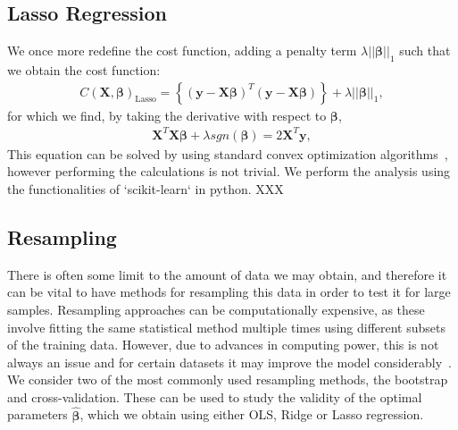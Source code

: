 \documentclass[reprint,english,notitlepage]{revtex4-1}  %
\begin{document}
\subsection*{Lasso Regression}
We once more redefine the cost function, adding a penalty term $\lambda||\boldsymbol{\beta}||_1$ such that we obtain the cost function: 
\begin{align}\label{eq: costfunc_lasso}
    C(\mathbf{X},\boldsymbol{\beta})_\text{Lasso} 
    = \left\{ (\boldsymbol{y} - \mathbf{X}\boldsymbol{\beta})^T (\boldsymbol{y} - \mathbf{X}\boldsymbol{\beta}) \right\} + \lambda||\boldsymbol{\beta}||_1, 
\end{align}
for which we find, by taking the derivative with respect to $\boldsymbol{\beta}$, 
\begin{align}\label{eq: optimal_lasso}
    \mathbf{X}^T\mathbf{X}\boldsymbol{\beta} + \lambda sgn(\boldsymbol{\beta}) = 2\mathbf{X}^T\boldsymbol{y}, 
\end{align}
This equation can be solved by using standard convex optimization algorithms~\cite{morthen}, however performing the calculations is not trivial. We perform the analysis using the functionalities of `scikit-learn` in python. XXX




\subsection{Resampling}
There is often some limit to the amount of data we may obtain, and therefore it can be vital to have methods for resampling this data in order to test it for large samples. Resampling approaches can be computationally expensive, as these involve fitting the same statistical method multiple times using different subsets of the training data. However, due to advances in computing power, this is not always an issue and for certain datasets it may improve the model considerably~\cite{morthen}. We consider two of the most commonly used resampling methods, the bootstrap and cross-validation. These can be used to study the validity of the optimal parameters $\boldsymbol{\hat{\beta}}$, which we obtain using either OLS, Ridge or Lasso regression. 
\end{document}
